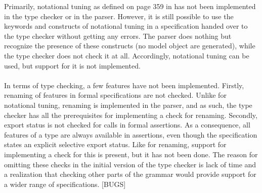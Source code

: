 Primarily, notational tuning as defined on page 359 in \cite{walden1995} has not been implemented in the type checker or in the parser. However, it is still possible to use the keywords and constructs of notational tuning in a specification handed over to the type checker without getting any errors. The parser does nothing but recognize the presence of these constructs (no model object are generated), while the type checker does not check it at all. Accordingly, notational tuning can be used, but support for it is not implemented.
\paragraph{}
In terms of type checking, a few features have not been implemented. Firstly, renaming of features in formal specifications are not checked. Unlike for notational tuning, renaming is implemented in the parser, and as such, the type checker has all the prerequisites for implementing a check for renaming. Secondly, export status is not checked for calls in formal assertions. As a consequence, all features of a type are always available in assertions, even though the specification states an explicit selective export status. Like for renaming, support for implementing a check for this is present, but it has not been done. The reason for omitting these checks in the initial version of the type checker is lack of time and a realization that checking other parts of the grammar would provide support for a wider range of specifications.
[BUGS]